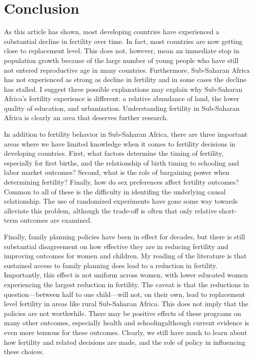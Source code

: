 \section{Conclusion}\label{conclusion}

As this article has shown, most developing countries have experienced a substantial decline in fertility over time. In fact, most countries are now getting close to replacement level. This does not, however, mean an immediate stop in population growth because of the large number of young people who have still not entered reproductive age in many countries. Furthermore, Sub-Saharan Africa has not experienced as strong as decline in fertility and in some cases the decline has stalled. I suggest three possible explanations may explain why Sub-Saharan Africa's fertility experience is different: a relative abundance of land, the lower quality of education, and urbanization. Understanding fertility in Sub-Saharan Africa is clearly an area that deserves further research.

In addition to fertility behavior in Sub-Saharan Africa, there are three important areas where we have limited knowledge when it comes to fertility decisions in developing countries. First, what factors determine the timing of fertility, especially for first births, and the relationship of birth timing to schooling and labor market outcomes? Second, what is the role of bargaining power when determining fertility? Finally, how do sex preferences affect fertility outcomes? Common to all of these is the difficulty in identifing the underlying causal relationship. The use of randomized experiments have gone some way towards alleviate this problem, although the trade-off is often that only relative short-term outcomes are examined.

Finally, family planning policies have been in effect for decades, but there is still substantial disagreement on how effective they are in reducing fertility and improving outcomes for women and children. My reading of the literature is that sustained access to family planning does lead to a reduction in fertility. Importantly, this effect is not uniform across women, with lower educated women experiencing the largest reduction in fertility. The caveat is that the reductions in question---between half to one child---will not, on their own, lead to replacement level fertility in areas like rural Sub-Saharan Africa. This does not imply that the policies are not worthwhile. There may be positive effects of these programs on many other outcomes, especially health and schoolingalthough current evidence is even more tenuous for these outcomes. Clearly, we still have much to learn about how fertility and related decisions are made, and the role of policy in influencing these choices.
